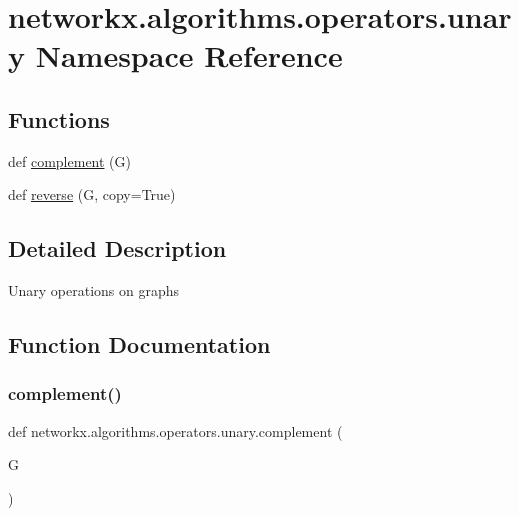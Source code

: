 \hypertarget{namespacenetworkx_1_1algorithms_1_1operators_1_1unary}{}\section{networkx.\+algorithms.\+operators.\+unary Namespace Reference}
\label{namespacenetworkx_1_1algorithms_1_1operators_1_1unary}
\subsection*{Functions}
\begin{DoxyCompactItemize}
\item 
def \hyperlink{namespacenetworkx_1_1algorithms_1_1operators_1_1unary_a91ae54bdf069149f50179f99f82b68b8}{complement} (G)
\item 
def \hyperlink{namespacenetworkx_1_1algorithms_1_1operators_1_1unary_a7a3d5849f1adccb2d9443d4040ce1b3d}{reverse} (G, copy=True)
\end{DoxyCompactItemize}


\subsection{Detailed Description}
\begin{DoxyVerb}Unary operations on graphs\end{DoxyVerb}
 

\subsection{Function Documentation}
\mbox{\label{namespacenetworkx_1_1algorithms_1_1operators_1_1unary_a91ae54bdf069149f50179f99f82b68b8}} 
\subsubsection{\texorpdfstring{complement()}{complement()}}
{\footnotesize\ttfamily def networkx.\+algorithms.\+operators.\+unary.\+complement (\begin{DoxyParamCaption}\item[{}]{G }\end{DoxyParamCaption})}

